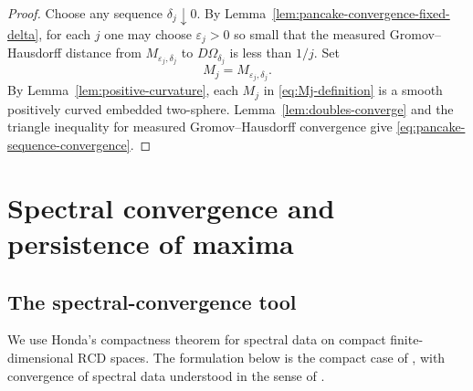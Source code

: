 \documentclass[11pt]{amsart}
\numberwithin{equation}{section}
\newcommand{\Om}{\Omega}
\newcommand{\eps}{\varepsilon}
\newcommand{\RCD}{\mathrm{RCD}}
\begin{document}
\begin{proof}
Choose any sequence $\delta_j\downarrow0$.  By
Lemma~\ref{lem:pancake-convergence-fixed-delta}, for each $j$ one may choose
$\eps_j>0$ so small that the measured Gromov--Hausdorff distance from
$M_{\eps_j,\delta_j}$ to $D\Om_{\delta_j}$ is less than $1/j$.  Set
\begin{equation}\label{eq:Mj-definition}
M_j=M_{\eps_j,\delta_j}.
\end{equation}
By Lemma~\ref{lem:positive-curvature}, each $M_j$ in \eqref{eq:Mj-definition} is
a smooth positively curved embedded two-sphere.  Lemma~\ref{lem:doubles-converge}
and the triangle inequality for measured Gromov--Hausdorff convergence give
\eqref{eq:pancake-sequence-convergence}.
\end{proof}

\section{Spectral convergence and persistence of maxima}\label{sec:spectral}

\subsection{The spectral-convergence tool}

We use Honda's compactness theorem for spectral data on compact
finite-dimensional \(\RCD\) spaces.  The formulation below is the compact case of
\cite[Theorem~3.7]{Honda}, with convergence of spectral data understood in the
sense of \cite[Definition~3.6]{Honda}.
\end{document}
